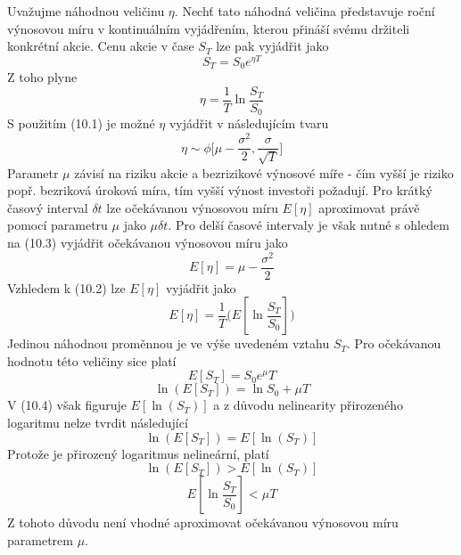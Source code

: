 \documentclass[a4paper]{book}
\begin{document}
Uvažujme náhodnou veličinu $\eta$. Nechť tato náhodná veličina představuje roční výnosovou míru v kontinuálním vyjádřením, kterou přináší svému držiteli konkrétní akcie. Cenu akcie v čase $S_T$ lze pak vyjádřit jako
\begin{equation*}
S_T = S_0 e^{\eta T}
\end{equation*}
Z toho plyne
\begin{equation}
\eta = \frac{1}{T} \ln \frac{S_T}{S_0}
\end{equation}
S použitím (10.1) je možné $\eta$ vyjádřit v následujícím tvaru
\begin{equation}
\eta \sim \phi \Bigg[ \mu - \frac{\sigma^2}{2},\frac{\sigma}{\sqrt{T}} \Bigg]
\end{equation}
Parametr $\mu$ závisí na riziku akcie a bezrizikové výnosové míře - čím vyšší je riziko popř. bezriková úroková míra, tím vyšší výnost investoři požadují. Pro krátký časový interval $\delta t$ lze očekávanou výnosovou míru $E[\eta]$ aproximovat právě pomocí parametru $\mu$ jako $\mu \delta t$. Pro delší časové intervaly je však nutné s ohledem na (10.3) vyjádřit očekávanou výnosovou míru jako
\begin{equation*}
E[\eta] = \mu - \frac{\sigma^2}{2}
\end{equation*}
Vzhledem k (10.2) lze $E[\eta]$ vyjádřit jako
\begin{equation}
E[\eta] = \frac{1}{T}\bigg(E[\ln \frac{S_T}{S_0}]\bigg)
\end{equation}
Jedinou náhodnou proměnnou je ve výše uvedeném vztahu $S_T$. Pro očekávanou hodnotu této veličiny sice platí
\begin{equation*}
E[S_T] = S_0 e^{\mu}{T}
\end{equation*}
\begin{equation*}
\ln (E[S_T]) = \ln S_0 + \mu T
\end{equation*}
V (10.4) však figuruje $E[\ln(S_T)]$ a z důvodu nelinearity přirozeného logaritmu nelze tvrdit následující
\begin{equation*}
\ln (E[S_T])=E[\ln (S_T)]
\end{equation*}
Protože je přirozený logaritmus nelineární, platí
\begin{equation*}
\ln(E[S_T]) > E[\ln(S_T)]
\end{equation*}
\begin{equation*}
E[\ln \frac{S_T}{S_0}] < \mu T
\end{equation*}
Z tohoto důvodu není vhodné aproximovat očekávanou výnosovou míru parametrem $\mu$.
\end{document}
